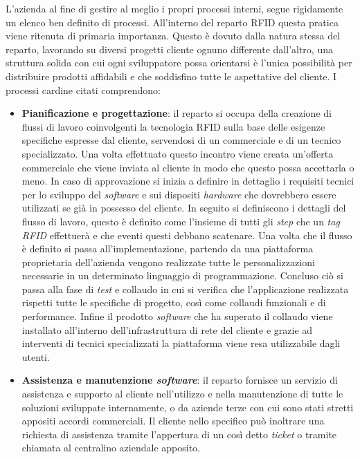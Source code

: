 L'azienda al fine di gestire al meglio i propri processi interni, segue rigidamente un elenco ben definito di processi. All'interno del reparto RFID questa
pratica viene ritenuta di primaria importanza. Questo è dovuto dalla natura stessa del reparto, lavorando su diversi progetti cliente ognuno differente 
dall'altro, una struttura solida con cui ogni sviluppatore possa orientarsi è l'unica possibilità per distribuire prodotti affidabili e che soddisfino
tutte le aspettative del cliente. I processi cardine citati comprendono:
\begin{itemize}
    \item \textbf{Pianificazione e progettazione}: il reparto si occupa della creazione di flussi di lavoro coinvolgenti la tecnologia RFID sulla base delle esigenze
    specifiche espresse dal cliente, servendosi di un commerciale e di un tecnico specializzato. Una volta effettuato questo incontro viene creata un'offerta
    commerciale che viene inviata al cliente in modo che questo possa accettarla o meno. In caso di approvazione si inizia a definire in dettaglio
    i requisiti tecnici per lo sviluppo del \emph{software} e sui dispositi \emph{hardware} che dovrebbero essere utilizzati se già in possesso del cliente.
    In seguito si definiscono i dettagli del flusso di lavoro, questo è definito come l'insieme di tutti gli \emph{step} che un \emph{tag RFID} 
    effettuerà e che eventi questi debbano scatenare. Una volta che il flusso è definito si passa all'implementazione, partendo da una piattaforma proprietaria dell'azienda 
    vengono realizzate tutte le personalizzazioni necessarie in un determinato linguaggio di programmazione.
    Concluso ciò si passa alla fase di \emph{test} e collaudo in cui si verifica che l’applicazione realizzata rispetti tutte le specifiche 
    di progetto, così come collaudi funzionali e di performance.
    Infine il prodotto \emph{software} che ha superato il collaudo viene installato all'interno dell'infrastruttura di rete del cliente e grazie ad interventi
    di tecnici specializzati la piattaforma viene resa utilizzabile dagli utenti.
    \item \textbf{Assistenza e manutenzione \emph{software}}: il reparto fornisce un servizio di assistenza e supporto al cliente nell'utilizzo e nella manutenzione 
    di tutte le soluzioni sviluppate internamente, o da aziende terze con cui sono stati stretti appositi accordi commerciali. Il cliente nello specifico può
    inoltrare una richiesta di assistenza tramite l'appertura di un così detto \emph{ticket} o tramite chiamata al centralino aziendale apposito.

\end{itemize}
